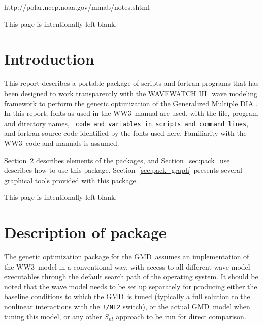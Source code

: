 \documentclass[12pt]{article}
\newcommand{\pstyle}{myheadings}
\newcommand{\wwt}{WAVEWATCH III$\:$\textsuperscript\textregistered}
\newcommand{\ws}{WW3}
\newcommand{\gmd}{GMD}
\newcommand{\file}{\sf}
\newcommand{\code}{\tt}
\newcommand{\F}{\sc}
\newcommand{\pb}{\strut \vfill \pagebreak}
\newcommand{\bpage}{\vfill \pagebreak \strut

\vspace{2.5in} \centerline{This page is intentionally left blank.}}
\newcommand{\bpagea}{\strut

\vspace{2.5in} \centerline{This page is intentionally left blank.}}
\newcommand{\newsec}{\setcounter{equation}{0}
                      \setcounter{myfigno}{0}
                      \setcounter{mytabno}{0}}
\newcounter{myfigno}[section]
\newcounter{mytabno}[section]
\begin{document}
\vspace{\baselineskip}
\centerline{http://polar.ncep.noaa.gov/mmab/notes.shtml}


\vfill \pagebreak

\tableofcontents

\pb
\pagestyle{empty}

\bpagea


\pb
\pagestyle{\pstyle}
\section{Introduction} \label{sec:intro}
\newsec

\noindent
This report describes a portable package of scripts and {\F fortran} programs
that has been designed to work transparently with the \wwt\ wave modeling
framework \citep[model henceforth denoted as \ws]{tol:MMAB09a} to perform the
genetic optimization \citep[e.g.,][]{bk:ES03} of the Generalized Multiple DIA
\citep[\gmd,][]{tol:MMAB10d}.  In this report, fonts as used in the \ws\
manual are used, with the {\file file, program and directory names}, {\code
code and variables in scripts and command lines}, and {\F fortran} source code
identified by the fonts used here. Familiarity with the \ws\ code and manuals
is assumed.

Section~\ref{sec:pack_desc} describes elements of the packages, and
Section~\ref{sec:pack_use} describes how to use this package.
Section~\ref{sec:pack_graph} presents several graphical tools provided with
this package.


\bpage
\pb
\section{Description of package} \label{sec:pack_desc}
\newsec

The genetic optimization package for the \gmd\ assumes an implementation of
the \ws\ model in a conventional way, with access to all different wave model
executables through the default search path of the operating system. It should
be noted that the wave model needs to be set up separately for producing
either the baseline conditions to which the \gmd\ is tuned (typically a full
solution to the nonlinear interactions with the {\code !/NL2} switch), or the
actual \gmd\ model when tuning this model, or any other $S_{nl}$ approach to
be run for direct comparison.
\end{document}

